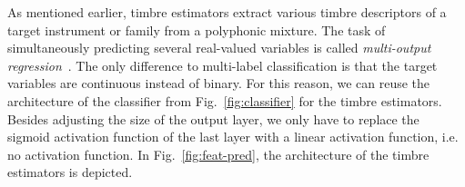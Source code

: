 As mentioned earlier, timbre estimators extract various timbre descriptors of a target instrument or family from a polyphonic mixture. The task of simultaneously predicting several real-valued variables is called \textit{multi-output regression}~\cite{borchani2015survey}. The only difference to multi-label classification is that the target variables are continuous instead of binary. For this reason, we can reuse the architecture of the classifier from Fig.~\ref{fig:classifier} for the timbre estimators. Besides adjusting the size of the output layer, we only have to replace the sigmoid activation function of the last layer with a linear activation function, i.e. no activation function. In Fig.~\ref{fig:feat-pred}, the architecture of the timbre estimators is depicted.\\

